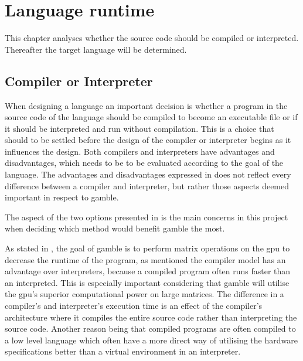\chapter{Language runtime}
This chapter analyses whether the source code should be compiled or interpreted.
Thereafter the target language will be determined. 

\section{Compiler or Interpreter}
When designing a language an important decision is whether a program in the source code of the language should be compiled to become an executable file or if it should be interpreted and run without compilation.
This is a choice that should to be settled before the design of the compiler or interpreter begins as it influences the design.
Both compilers and interpreters have advantages and disadvantages, which needs to be to be evaluated according to the goal of the language.
The advantages and disadvantages expressed in  does not reflect every difference between a compiler and interpreter, but rather those aspects deemed important in respect to \gls{gamble}.



The aspect of the two options presented in  is the main concerns in this project when deciding which method would benefit \gls{gamble} the most.

As stated in , the goal of \gls{gamble} is to perform matrix operations on the \acrshort{gpu} to decrease the runtime of the program, as mentioned the compiler model has an advantage over interpreters, because a compiled program often runs faster than an interpreted. 
This is especially important considering that \gls{gamble} will utilise the \acrshort{gpu}'s superior computational power on large matrices. 
The difference in a compiler's and interpreter's execution time is an effect of the compiler's architecture where it compiles the entire source code rather than interpreting the source code. 
Another reason being that compiled programs are often compiled to a low level language which often have a more direct way of utilising the hardware specifications better than a virtual environment in an interpreter.

